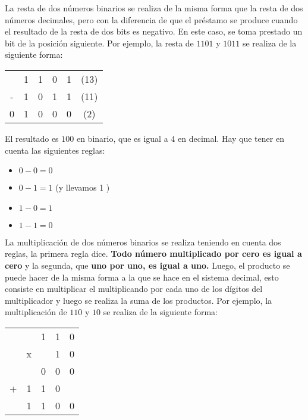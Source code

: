 \begin{metodo}
    La resta de dos números binarios se realiza de la misma forma que la resta de dos números decimales, pero con la diferencia de que el préstamo se produce cuando el resultado de la resta de dos bits es negativo. En este caso, se toma prestado un bit de la posición siguiente.
    Por ejemplo, la resta de $1101$ y $1011$ se realiza de la siguiente forma:
    \begin{table}[H]
        \centering
        \begin{tabular}{cccccc}
            & 1 & 1 & 0 & 1 & (13) \\
            - & 1 & 0 & 1 & 1 & (11) \\ \hline
            0 & 1 & 0 & 0 & 0 & (2)
        \end{tabular}
    \end{table}
    El resultado es $100$ en binario, que es igual a $4$ en decimal.
    Hay que tener en cuenta las siguientes reglas:
    \begin{itemize}
        \item $0 - 0 = 0$
        \item $0 - 1 = 1$ (y llevamos 1 )
        \item $1 - 0 = 1$
        \item $1 - 1 = 0$
    \end{itemize}
\end{metodo}

\begin{metodo}
    La multiplicación de dos números binarios se realiza teniendo en cuenta dos reglas, la primera regla dice. \textbf{Todo número multiplicado por cero es igual a cero} y la segunda, que \textbf{uno por uno, es igual a uno.} Luego, el producto se puede hacer de la misma forma a la que se hace en el sistema decimal, esto consiste en multiplicar el multiplicando por cada uno de los dígitos del multiplicador y luego se realiza la suma de los productos.
    Por ejemplo, la multiplicación de $110$ y $10$ se realiza de la siguiente forma:
    \begin{table}[H]
        \centering
        \begin{tabular}{ccccc}
            &   & 1 & 1 & 0 \\
            & x &   & 1 & 0 \\ \hline
            &   & 0 & 0 & 0 \\
            + & 1 & 1 & 0 &  \\ \hline
            & 1 & 1 & 0 & 0
        \end{tabular}
    \end{table}
\end{metodo}

